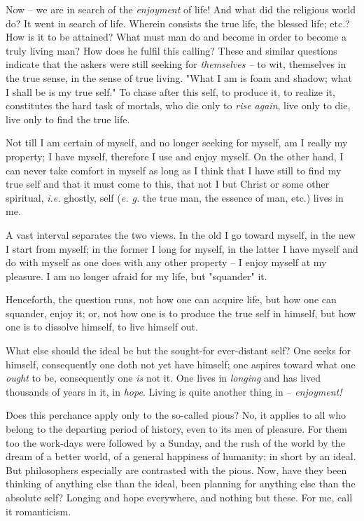 \documentclass[a4paper]{book}
\begin{document}
Now -- we are in search of the \textit{enjoyment} of life! And what did the 
religious world do? It went in search of life. Wherein consists the true life, 
the blessed life; etc.? How is it to be attained? What must man do and become 
in order to become a truly living man? How does he fulfil this calling? These 
and similar questions indicate that the askers were still seeking for 
\textit{themselves --} to wit, themselves in the true sense, in the sense of 
true living. "{}What I am is foam and shadow; what I shall be is my true 
self."{} To chase after this self, to produce it, to realize it, constitutes 
the hard task of mortals, who die only to \textit{rise again}, live only to 
die, live only to find the true life.

Not till I am certain of myself, and no longer seeking for myself, am I really 
my property; I have myself, therefore I use and enjoy myself. On the other 
hand, I can never take comfort in myself as long as I think that I have still 
to find my true self and that it must come to this, that not I but Christ or 
some other spiritual, \textit{i.e.} ghostly, self (\textit{e. g.} the true 
man, the essence of man, etc.) lives in me.

A vast interval separates the two views. In the old I go toward myself, in the 
new I start from myself; in the former I long for myself, in the latter I have 
myself and do with myself as one does with any other property -- I enjoy 
myself at my pleasure. I am no longer afraid for my life, but "{}squander"{} 
it.

Henceforth, the question runs, not how one can acquire life, but how one can 
squander, enjoy it; or, not how one is to produce the true self in himself, 
but how one is to dissolve himself, to live himself out.

What else should the ideal be but the sought-for ever-distant self? One seeks 
for himself, consequently one doth not yet have himself; one aspires toward 
what one \textit{ought} to be, consequently one \textit{is} not it. One lives 
in \textit{longing} and has lived thousands of years in it, in \textit{hope}. 
Living is quite another thing in -- \textit{enjoyment!}

Does this perchance apply only to the so-called pious? No, it applies to all 
who belong to the departing period of history, even to its men of pleasure. 
For them too the work-days were followed by a Sunday, and the rush of the 
world by the dream of a better world, of a general happiness of humanity; in 
short by an ideal. But philosophers especially are contrasted with the pious. 
Now, have they been thinking of anything else than the ideal, been planning 
for anything else than the absolute self? Longing and hope everywhere, and 
nothing but these. For me, call it romanticism.
\end{document}
